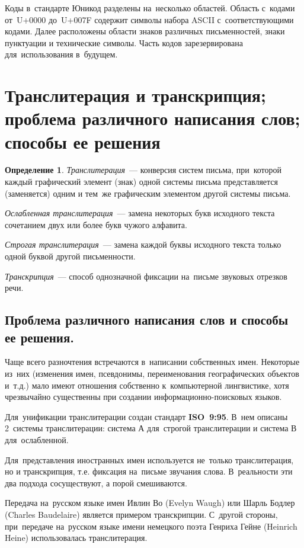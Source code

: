 \documentclass[12pt]{article}
\theoremstyle{definition}
\newtheorem*{defn}{Определение}
\theoremstyle{remark}
\numberwithin{equation}{section}
\begin{document}
Коды в~стандарте Юникод разделены на~несколько областей. Область с~кодами от~U+0000
до~U+007F содержит символы набора ASCII с~соответствующими кодами.
Далее расположены области знаков различных письменностей, знаки пунктуации и
технические символы. Часть кодов зарезервирована для~использования в~будущем.

\section{Транслитерация и транскрипция; проблема различного написания слов; способы ее решения}
\begin{defn}
\textsl{Транслитерация}~--- конверсия систем письма, при~которой каждый
графический элемент (знак) одной системы письма представляется (заменяется)
одним и тем~же графическим элементом другой системы письма.

\textsl{Ослабленная транслитерация}~--- замена некоторых букв исходного текста
сочетанием двух или более букв чужого алфавита.

\textsl{Строгая транслитерация}~--- замена каждой буквы исходного текста
только одной буквой другой письменности.

\textsl{Транскрипция}~--- способ однозначной фиксации на~письме звуковых
отрезков речи.
\end{defn}

\subsection{Проблема различного написания слов и способы ее решения.}
Чаще всего разночтения встречаются в~написании собственных имен. Некоторые
из~них (изменения имен, псевдонимы, переименования географических объектов и~т.д.)
мало имеют отношения собственно к~компьютерной лингвистике, хотя чрезвычайно
существенны при создании информационно-поисковых языков.

Для~унификации транслитерации создан стандарт \textbf{ISO~9:95}. В~нем
описаны 2~системы транслитерации: система А для~строгой транслитерации
и система В для~ослабленной.

Для~представления иностранных имен используется не~только транслитерация,
но и транскрипция, т.е. фиксация на~письме звучания слова. В~реальности
эти два подхода сосуществуют, а порой смешиваются.

Передача на~русском языке имен Ивлин Во (Evelyn Waugh) или Шарль Бодлер
(Charles Baudelaire) является примером транскрипции. С~другой стороны,
при~передаче на~русском языке имени немецкого поэта Генриха Гейне (Heinrich
Heine) использовалась транслитерация.
\end{document}
